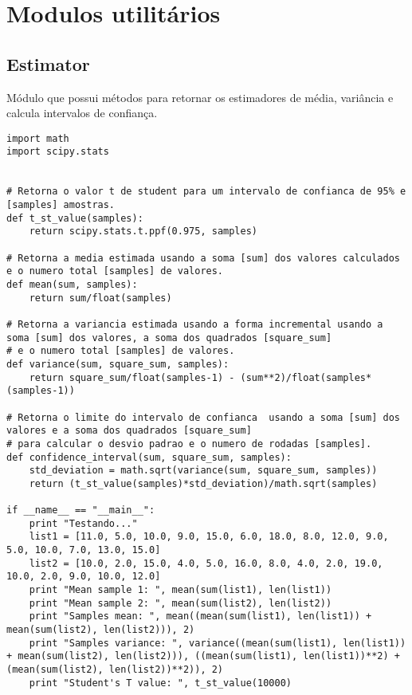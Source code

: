 \section{Modulos utilitários}

\subsection{Estimator}
Módulo que possui métodos para retornar os estimadores de média, variância e calcula intervalos de confiança.\\

\begin{lstlisting}
import math
import scipy.stats


# Retorna o valor t de student para um intervalo de confianca de 95% e [samples] amostras.
def t_st_value(samples):
    return scipy.stats.t.ppf(0.975, samples)

# Retorna a media estimada usando a soma [sum] dos valores calculados e o numero total [samples] de valores.
def mean(sum, samples):
    return sum/float(samples)

# Retorna a variancia estimada usando a forma incremental usando a soma [sum] dos valores, a soma dos quadrados [square_sum]
# e o numero total [samples] de valores.
def variance(sum, square_sum, samples):
    return square_sum/float(samples-1) - (sum**2)/float(samples*(samples-1))

# Retorna o limite do intervalo de confianca  usando a soma [sum] dos valores e a soma dos quadrados [square_sum]
# para calcular o desvio padrao e o numero de rodadas [samples].
def confidence_interval(sum, square_sum, samples):
    std_deviation = math.sqrt(variance(sum, square_sum, samples))
    return (t_st_value(samples)*std_deviation)/math.sqrt(samples)

if __name__ == "__main__":
    print "Testando..."
    list1 = [11.0, 5.0, 10.0, 9.0, 15.0, 6.0, 18.0, 8.0, 12.0, 9.0, 5.0, 10.0, 7.0, 13.0, 15.0]
    list2 = [10.0, 2.0, 15.0, 4.0, 5.0, 16.0, 8.0, 4.0, 2.0, 19.0, 10.0, 2.0, 9.0, 10.0, 12.0]
    print "Mean sample 1: ", mean(sum(list1), len(list1))
    print "Mean sample 2: ", mean(sum(list2), len(list2))
    print "Samples mean: ", mean((mean(sum(list1), len(list1)) + mean(sum(list2), len(list2))), 2)
    print "Samples variance: ", variance((mean(sum(list1), len(list1)) + mean(sum(list2), len(list2))), ((mean(sum(list1), len(list1))**2) + (mean(sum(list2), len(list2))**2)), 2)
    print "Student's T value: ", t_st_value(10000)
\end{lstlisting}

